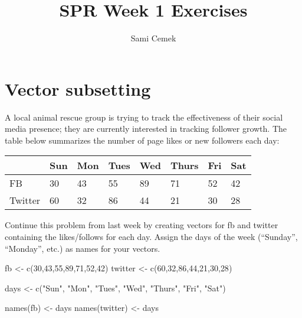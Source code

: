 \documentclass[
]{article}
\title{SPR Week 1 Exercises}
\author{Sami Cemek}
\date{}
\newenvironment{Shaded}{\begin{snugshade}}{\end{snugshade}}
\newcommand{\DecValTok}[1]{\textcolor[rgb]{0.00,0.00,0.81}{#1}}
\newcommand{\FunctionTok}[1]{\textcolor[rgb]{0.00,0.00,0.00}{#1}}
\newcommand{\NormalTok}[1]{#1}
\newcommand{\OtherTok}[1]{\textcolor[rgb]{0.56,0.35,0.01}{#1}}
\newcommand{\StringTok}[1]{\textcolor[rgb]{0.31,0.60,0.02}{#1}}
\begin{document}
\maketitle

\hypertarget{vector-subsetting}{%
\section{Vector subsetting}\label{vector-subsetting}}

A local animal rescue group is trying to track the effectiveness of
their social media presence; they are currently interested in tracking
follower growth. The table below summarizes the number of page likes or
new followers each day:

\begin{longtable}[]{@{}llllllll@{}}
\toprule
& Sun & Mon & Tues & Wed & Thurs & Fri & Sat \\
\midrule
\endhead
FB & 30 & 43 & 55 & 89 & 71 & 52 & 42 \\
Twitter & 60 & 32 & 86 & 44 & 21 & 30 & 28 \\
\bottomrule
\end{longtable}

Continue this problem from last week by creating vectors for fb and
twitter containing the likes/follows for each day. Assign the days of
the week (``Sunday'', ``Monday'', etc.) as names for your vectors.

\begin{Shaded}
\begin{Highlighting}[]
\NormalTok{fb }\OtherTok{\textless{}{-}} \FunctionTok{c}\NormalTok{(}\DecValTok{30}\NormalTok{,}\DecValTok{43}\NormalTok{,}\DecValTok{55}\NormalTok{,}\DecValTok{89}\NormalTok{,}\DecValTok{71}\NormalTok{,}\DecValTok{52}\NormalTok{,}\DecValTok{42}\NormalTok{)}
\NormalTok{twitter }\OtherTok{\textless{}{-}} \FunctionTok{c}\NormalTok{(}\DecValTok{60}\NormalTok{,}\DecValTok{32}\NormalTok{,}\DecValTok{86}\NormalTok{,}\DecValTok{44}\NormalTok{,}\DecValTok{21}\NormalTok{,}\DecValTok{30}\NormalTok{,}\DecValTok{28}\NormalTok{)}

\NormalTok{days }\OtherTok{\textless{}{-}} \FunctionTok{c}\NormalTok{(}\StringTok{"Sun"}\NormalTok{, }\StringTok{"Mon"}\NormalTok{, }\StringTok{"Tues"}\NormalTok{, }\StringTok{"Wed"}\NormalTok{, }\StringTok{"Thurs"}\NormalTok{, }\StringTok{"Fri"}\NormalTok{, }\StringTok{"Sat"}\NormalTok{)}

\FunctionTok{names}\NormalTok{(fb) }\OtherTok{\textless{}{-}}\NormalTok{ days}
\FunctionTok{names}\NormalTok{(twitter) }\OtherTok{\textless{}{-}}\NormalTok{ days}
\end{Highlighting}
\end{Shaded}
\end{document}
